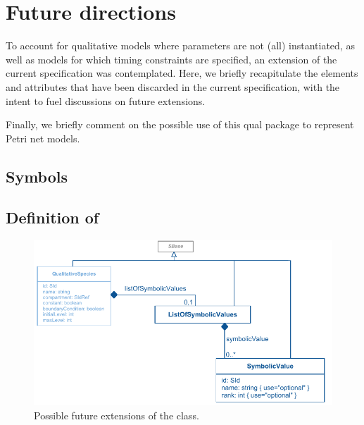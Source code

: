 
\section{Future directions}
\label{apdx-future}

To account for qualitative models where parameters are not (all) instantiated, as well as models for which timing constraints are specified, an extension of the current specification was contemplated. Here, we briefly recapitulate the elements and attributes that have been discarded in the current specification, with the intent to fuel discussions on future extensions.

Finally, we briefly comment on the possible use of this qual package to represent Petri net  models. 



\subsection{Symbols}

\subsection*{Definition of } %

\begin{figure}[hb]
  \includegraphics{figs/qual-qualitative-species-future-uml.pdf}
  \caption{Possible future extensions of the \QualitativeSpecies class.}
  \label{qual_future_directions}
\end{figure}

